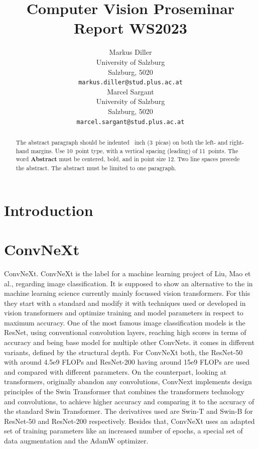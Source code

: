 \documentclass{article}
\title{Computer Vision Proseminar Report WS2023}
\author{%
    Markus Diller\\
    University of Salzburg\\
    Salzburg, 5020 \\
    \texttt{markus.diller@stud.plus.ac.at} \\
    \And
    Marcel Sargant \\
    University of Salzburg \\
    Salzburg, 5020 \\
    \texttt{marcel.sargant@stud.plus.ac.at} \\
}
\begin{document}
\maketitle


\begin{abstract}
    The abstract paragraph should be indented ~inch (3~picas) on both the left- and right-hand margins.
    Use 10~point type, with a vertical spacing (leading) of 11~points.
    The word \textbf{Abstract} must be centered, bold, and in point size 12.
    Two line spaces precede the abstract.
    The abstract must be limited to one paragraph.
\end{abstract}


\section{Introduction}\label{sec:introduction}

\section{ConvNeXt}\label{sec:convnext}
ConvNeXt\cite{liu2022convnet}.
ConvNeXt is the label for a machine learning project of Liu, Mao et al., regarding image classification. It is supposed to show an alternative to the in machine learning science currently mainly focussed vision transformers. For this they start with a standard and modify it with techniques used or developed in vision transformers and optimize training and model parameters in respect to maximum accuracy.
One of the most famous image classification models is the ResNet, using conventional convolution layers, reaching high scores in terms of accuracy and being base model for multiple other ConvNets. it comes in different variants, defined by the structural depth. For ConvNeXt both, the ResNet-50 with around 4.5e9 FLOPs and ResNet-200 having around 15e9 FLOPs are used and compared with different parameters. On the counterpart, looking at transformers, originally abandon any convolutions, ConvNext implements design principles of the Swin Transformer that combines the transformers technology and convolutions, to achieve higher accuracy and comparing it to the accuracy of the standard Swin Transformer. The derivatives used are Swin-T and Swin-B for ResNet-50 and ResNet-200 respectively. Besides that, ConvNeXt uses an adapted set of training parameters like an increased number of epochs, a special set of data augmentation and the AdamW optimizer.
\end{document}
